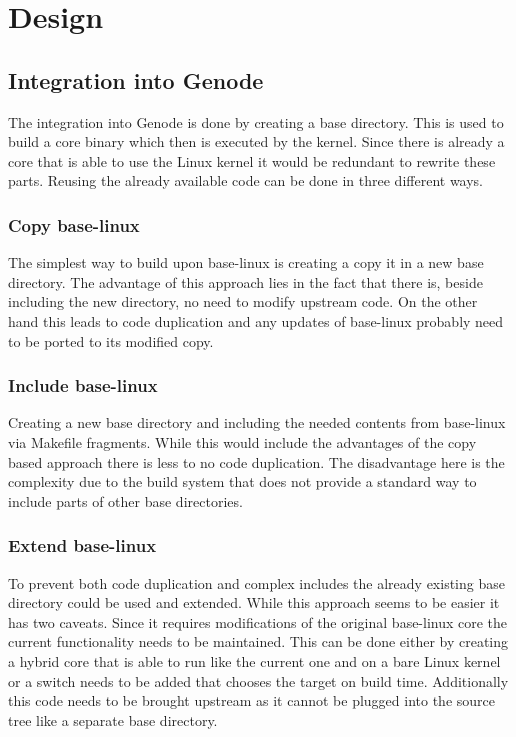 \documentclass[
a4paper,
12pt,
notitlepage,
parskip=half,
DIV=11,
]{scrbook}
\begin{document}
	
	\chapter{Design}
	
		\section{Integration into Genode}
		The integration into Genode is done by creating a base directory.
		This is used to build a core binary which then is executed by the kernel.
		Since there is already a core that is able to use the Linux kernel it would be redundant to rewrite these parts.
		Reusing the already available code can be done in three different ways.
	
		\subsection{Copy base-linux}
		The simplest way to build upon base-linux is creating a copy it in a new base directory.
		The advantage of this approach lies in the fact that there is, beside including the new directory, no need to modify upstream code.
		On the other hand this leads to code duplication and any updates of base-linux probably need to be ported to its modified copy.
	
		\subsection{Include base-linux}
		Creating a new base directory and including the needed contents from base-linux via Makefile fragments.
		While this would include the advantages of the copy based approach there is less to no code duplication.
		The disadvantage here is the complexity due to the build system that does not provide a standard way to include parts of other base directories.
	
		\subsection{Extend base-linux}
		To prevent both code duplication and complex includes the already existing base directory could be used and extended.
		While this approach seems to be easier it has two caveats.
		Since it requires modifications of the original base-linux core the current functionality needs to be maintained.
		This can be done either by creating a hybrid core that is able to run like the current one and on a bare Linux kernel or a switch needs to be added that chooses the target on build time.
		Additionally this code needs to be brought upstream as it cannot be plugged into the source tree like a separate base directory.
		
\end{document}

